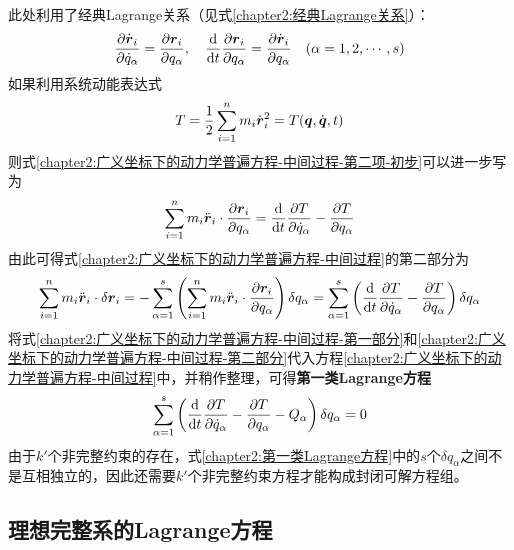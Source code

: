 此处利用了经典Lagrange关系（见式\eqref{chapter2:经典Lagrange关系}）：
\begin{equation*}
	\frac{\partial \dot{\boldsymbol{r}}_i}{\partial \dot{q}_\alpha} = \frac{\partial \boldsymbol{r}_i}{\partial q_\alpha}, \quad \frac{\mathrm{d}}{\mathrm{d} t}\frac{\partial \boldsymbol{r}_i}{\partial q_\alpha} = \frac{\partial \dot{\boldsymbol{r}}_i}{\partial q_\alpha}\quad (\alpha=1,2,\cdots,s)
\end{equation*}
如果利用系统动能表达式
\begin{equation}
	T = \frac12 \sum_{i=1}^n m_i\dot{\boldsymbol{r}}_i^2 = T(\boldsymbol{q},\dot{\boldsymbol{q}},t)
	\label{chapter2:系统动能表达式}
\end{equation}
则式\eqref{chapter2:广义坐标下的动力学普遍方程-中间过程-第二项-初步}可以进一步写为
\begin{equation}
	\sum_{i=1}^nm_i\ddot{\boldsymbol{r}}_i\cdot \frac{\partial \boldsymbol{r}_i}{\partial q_\alpha} = \frac{\mathrm{d}}{\mathrm{d} t}\frac{\partial T}{\partial \dot{q}_\alpha} - \frac{\partial T}{\partial q_\alpha}
	\label{chapter2:广义坐标下的动力学普遍方程-中间过程-第二项}
\end{equation}
由此可得式\eqref{chapter2:广义坐标下的动力学普遍方程-中间过程}的第二部分为
\begin{equation}
	\sum_{i=1}^n m_i\ddot{\boldsymbol{r}}_i\cdot\delta \boldsymbol{r}_i = -\sum_{\alpha=1}^s\left(\sum_{i=1}^n m_i\ddot{\boldsymbol{r}}_i\cdot \frac{\partial \boldsymbol{r}_i}{\partial q_\alpha}\right) \delta q_\alpha = \sum_{\alpha=1}^s\left(\frac{\mathrm{d}}{\mathrm{d} t}\frac{\partial T}{\partial \dot{q}_\alpha} - \frac{\partial T}{\partial q_\alpha}\right)\delta q_\alpha
	\label{chapter2:广义坐标下的动力学普遍方程-中间过程-第二部分}
\end{equation}
将式\eqref{chapter2:广义坐标下的动力学普遍方程-中间过程-第一部分}和\eqref{chapter2:广义坐标下的动力学普遍方程-中间过程-第二部分}代入方程\eqref{chapter2:广义坐标下的动力学普遍方程-中间过程}中，并稍作整理，可得{\bf 第一类Lagrange方程}
\begin{equation}
	\sum_{\alpha=1}^s \left(\frac{\mathrm{d}}{\mathrm{d} t}\frac{\partial T}{\partial \dot{q}_\alpha} - \frac{\partial T}{\partial q_\alpha}-Q_\alpha\right)\delta q_\alpha = 0
	\label{chapter2:第一类Lagrange方程}
\end{equation}
由于$k'$个非完整约束的存在，式\eqref{chapter2:第一类Lagrange方程}中的$s$个$\delta q_\alpha$之间不是互相独立的，因此还需要$k'$个非完整约束方程才能构成封闭可解方程组。

\subsection{理想完整系的Lagrange方程}\label{chapter2:subsection-理想完整系的Lagrange方程}

